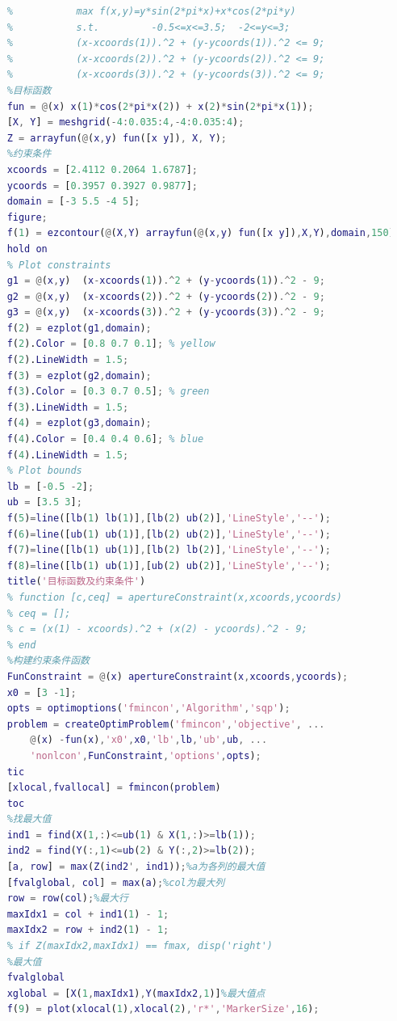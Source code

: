     \begin{lstlisting}[language=Matlab]
    %% 智能优化引例2：有约束
    %           max f(x,y)=y*sin(2*pi*x)+x*cos(2*pi*y)
    %           s.t.         -0.5<=x<=3.5;  -2<=y<=3;
    %           (x-xcoords(1)).^2 + (y-ycoords(1)).^2 <= 9;
    %           (x-xcoords(2)).^2 + (y-ycoords(2)).^2 <= 9;
    %           (x-xcoords(3)).^2 + (y-ycoords(3)).^2 <= 9;
    %目标函数
    fun = @(x) x(1)*cos(2*pi*x(2)) + x(2)*sin(2*pi*x(1));
    [X, Y] = meshgrid(-4:0.035:4,-4:0.035:4);
    Z = arrayfun(@(x,y) fun([x y]), X, Y);
    %约束条件
    xcoords = [2.4112 0.2064 1.6787];
    ycoords = [0.3957 0.3927 0.9877];
    domain = [-3 5.5 -4 5];
    figure;
    f(1) = ezcontour(@(X,Y) arrayfun(@(x,y) fun([x y]),X,Y),domain,150);
    hold on
    % Plot constraints
    g1 = @(x,y)  (x-xcoords(1)).^2 + (y-ycoords(1)).^2 - 9;
    g2 = @(x,y)  (x-xcoords(2)).^2 + (y-ycoords(2)).^2 - 9;
    g3 = @(x,y)  (x-xcoords(3)).^2 + (y-ycoords(3)).^2 - 9;
    f(2) = ezplot(g1,domain);
    f(2).Color = [0.8 0.7 0.1]; % yellow
    f(2).LineWidth = 1.5;
    f(3) = ezplot(g2,domain);
    f(3).Color = [0.3 0.7 0.5]; % green
    f(3).LineWidth = 1.5;
    f(4) = ezplot(g3,domain);
    f(4).Color = [0.4 0.4 0.6]; % blue
    f(4).LineWidth = 1.5;
    % Plot bounds
    lb = [-0.5 -2];
    ub = [3.5 3];
    f(5)=line([lb(1) lb(1)],[lb(2) ub(2)],'LineStyle','--');
    f(6)=line([ub(1) ub(1)],[lb(2) ub(2)],'LineStyle','--');
    f(7)=line([lb(1) ub(1)],[lb(2) lb(2)],'LineStyle','--');
    f(8)=line([lb(1) ub(1)],[ub(2) ub(2)],'LineStyle','--');
    title('目标函数及约束条件')
    % function [c,ceq] = apertureConstraint(x,xcoords,ycoords)
    % ceq = [];
    % c = (x(1) - xcoords).^2 + (x(2) - ycoords).^2 - 9;
    % end
    %构建约束条件函数
    FunConstraint = @(x) apertureConstraint(x,xcoords,ycoords);
    x0 = [3 -1];
    opts = optimoptions('fmincon','Algorithm','sqp');
    problem = createOptimProblem('fmincon','objective', ...
        @(x) -fun(x),'x0',x0,'lb',lb,'ub',ub, ...
        'nonlcon',FunConstraint,'options',opts);
    tic
    [xlocal,fvallocal] = fmincon(problem)
    toc
    %找最大值
    ind1 = find(X(1,:)<=ub(1) & X(1,:)>=lb(1));
    ind2 = find(Y(:,1)<=ub(2) & Y(:,2)>=lb(2));
    [a, row] = max(Z(ind2', ind1));%a为各列的最大值
    [fvalglobal, col] = max(a);%col为最大列
    row = row(col);%最大行
    maxIdx1 = col + ind1(1) - 1;
    maxIdx2 = row + ind2(1) - 1;
    % if Z(maxIdx2,maxIdx1) == fmax, disp('right')
    %最大值
    fvalglobal
    xglobal = [X(1,maxIdx1),Y(maxIdx2,1)]%最大值点
    f(9) = plot(xlocal(1),xlocal(2),'r*','MarkerSize',16);

\end{lstlisting}
